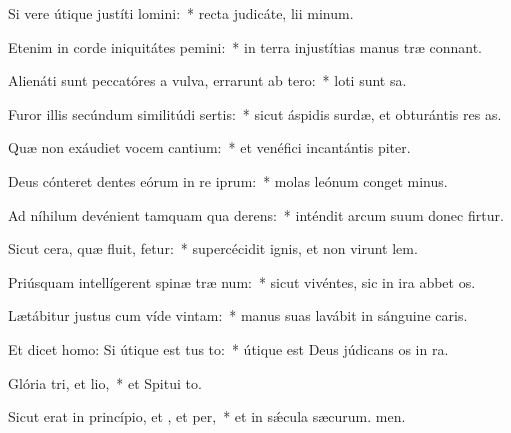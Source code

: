 \item Si vere útique justíti lomini:~* recta judicáte, lii minum.
\item Etenim in corde iniquitátes pemini:~* in terra injustítias manus træ connant.
\item Alienáti sunt peccatóres a vulva, errarunt ab tero:~* loti sunt sa.
\item Furor illis secúndum similitúdi sertis:~* sicut áspidis surdæ, et obturántis res as.
\item Quæ non exáudiet vocem cantium:~* et venéfici incantántis piter.
\item Deus cónteret dentes eórum in re iprum:~* molas leónum conget minus.
\item Ad níhilum devénient tamquam qua derens:~* inténdit arcum suum donec firtur.
\item Sicut cera, quæ fluit, fetur:~* supercécidit ignis, et non virunt lem.
\item Priúsquam intellígerent spinæ træ num:~* sicut vivéntes, sic in ira abbet os.
\item Lætábitur justus cum víde vintam:~* manus suas lavábit in sánguine caris.
\item Et dicet homo: Si útique est tus to:~* útique est Deus júdicans os in ra.
\item Glória tri, et lio,~* et Spitui to.
\item Sicut erat in princípio, et , et per,~* et in sǽcula sæcurum. men.

